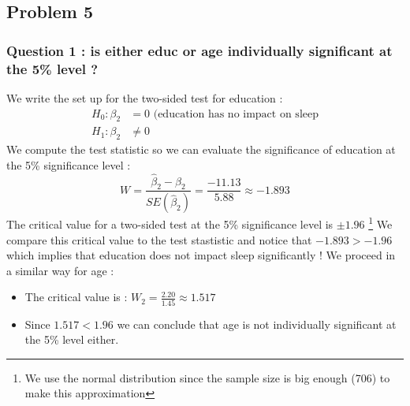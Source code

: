 \documentclass{article}
\begin{document}
\subsection{Problem 5}

\subsubsection{Question 1 : is either educ or age individually significant at the 5\% level ?}
We write the set up for the two-sided test for education :
\begin{equation}
\begin{aligned}
    H_0 : \beta_2 &= 0 \text{ (education has no impact on sleep} \\
    H_1 : \beta_2 &\neq 0
\end{aligned}
\end{equation}
We compute the test statistic so we can evaluate the significance of education at the 5\% significance level :
\begin{equation}
    W = \frac{\hat{\beta}_2-\beta_2}{SE(\hat{\beta}_2)} = \frac{-11.13}{5.88} \approx -1.893
\end{equation}
The critical value for a two-sided test at the 5\% significance level is $\pm 1.96$ \footnote[4]{We use the normal distribution since the sample size is big enough (706) to make this approximation}
We compare this critical value to the test stastistic and notice that $-1.893 > -1.96$ which implies that education does not impact sleep significantly !
We proceed in a similar way for age : 
\begin{itemize}
    \item The critical value is : $W_2 = \frac{2.20}{1.45} \approx 1.517$
    \item Since $1.517 < 1.96$ we can conclude that age is not individually significant at the 5\% level either. 
\end{itemize}
\end{document}
